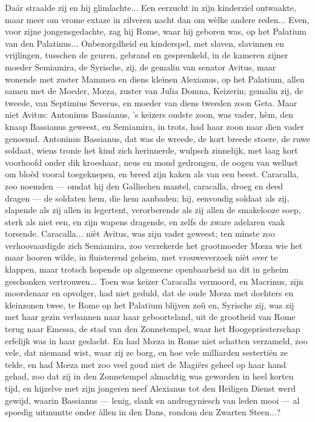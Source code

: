 \documentclass[a4paper, 12pt, oneside, dutch]{article}
\begin{document}
Daár straalde zij en hij glimlachte... Een eerzucht in zijn kinderziel ontwaakte, maar meer om vrome extaze in zilveren nacht dan om wèlke andere reden... Even, voor zijne jongensgedachte, zag hij Rome, waar hij geboren was, op het Palatium van den Palatinus... Onbezorgdheid en kinderspel, met slaven, slavinnen en vrijlingen, tusschen de geuren, gebrand en gesprenkeld, in de kameren zijner moeder Semiamira, de Syrische, zij, de gemalin van senator Avitus, maar wonende met zuster Mammea en diens kleinen Alexianus, op het Palatium, allen samen met de Moeder, Mœza, zuster van Julia Domna, Keizerin; gemalin zij, de tweede, van Septimius Severus, en moeder van diens tweeden zoon Geta. Maar niet Avitus: Antoninus Bassianus, 's keizers oudste zoon, was vader, hèm, den knaap Bassianus geweest, en Semiamira, in trots, had haar zoon naar dien vader genoemd. Antoninus Bassianus, dat was de wreede, de kort breede stoere, de ruwe soldaat, wiens tronie het kind zich herinnerde, wulpsch zinnelijk, met laag kort voorhoofd onder dik kroeshaar, neus en mond gedrongen, de oogen van wellust om bloèd vooral toegeknepen, en breed zijn kaken als van een beest. Caracalla, zoo noemden --- omdat hij den Gallischen mantel, caracalla, droeg en deed dragen --- de soldaten hem, die hem aanbaden; hij, eenvoudig soldaat als zij, slapende als zij allen in legertent, verorberende als zij allen de smakelooze soep, sterk als niet een, en zijn wapens dragende, en zelfs de zware adelaren vaak torsende. Caracalla... nièt Avitus, was zijn vader geweest; ten minste zoo verhoovaardigde zich Semiamira, zoo verzekerde het grootmoeder Mœza wie het maar hooren wilde, in fluisterend geheim, met vrouweverzoek nièt over te klappen, maar trotsch hopende op algemeene openbaarheid na dit in geheim geschonken vertrouwen... Toen was keizer Caracalla vermoord, en Macrinus, zijn moordenaar en opvolger, had niet geduld, dat de oude Mœza met dochters en kleinzonen twee, te Rome op het Palatium blijven zoû en, Syrische zij, was zij met haar gezin verbannen naar haar geboorteland, uit de grootheid van Rome terug naar Emessa, de stad van den Zonnetempel, waar het Hoogepriesterschap erfelijk was in haar geslacht. En had Mœza in Rome niet schatten verzameld, zoo vele, dat niemand wist, waar zij ze borg, en hoe vele milliarden sestertiën ze telde, en had Mœza met zoo veel goud niet de Magiërs geheel op haar hand gehad, zoo dat zij in den Zonnetempel almachtig was geworden in heel korten tijd, en hijzelve met zijn jongeren neef Alexianus tot den Heiligen Dienst werd gewijd, waarin Bassianus --- lenig, slank en androgyniesch van leden mooi --- al spoedig uitmuntte onder àllen in den Dans, rondom den Zwarten Steen...?
\end{document}
